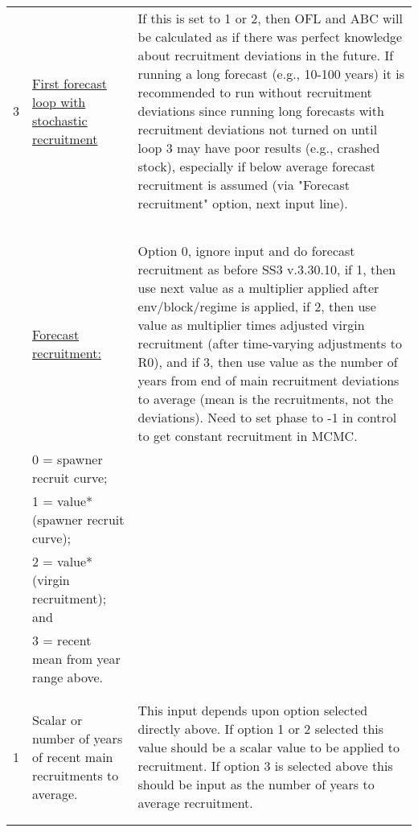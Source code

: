\begin{landscape}
{\begin{longtable}{p{3.2cm} p{7cm} p{10.8cm}}
 \hline  
 3 \Tstrut & \hyperlink{appendB}{First forecast loop with stochastic recruitment} & \multirow{1}{1cm}[-0.25cm]{\parbox{11cm}{If this is set to 1 or 2, then OFL and ABC will be calculated as if there was perfect knowledge about recruitment deviations in the future. If running a long forecast (e.g., 10-100 years) it is recommended to run without recruitment deviations since running long forecasts with recruitment deviations not turned on until loop 3 may have poor results (e.g., crashed stock), especially if below average forecast recruitment is assumed (via "Forecast recruitment" option, next input line). }} \Bstrut\\
  & & \\
  & & \\
  & & \\
  & & \\
  & & \\
 
 \pagebreak
 0 \Tstrut & \hyperlink{ForeSpawn}{Forecast recruitment:} & \multirow{1}{1cm}[-0.25cm]{\parbox{11cm}{Option 0, ignore input and do forecast recruitment as before SS3 v.3.30.10, if 1, then use next value as a multiplier applied after env/block/regime is applied, if 2, then use value as multiplier times adjusted virgin recruitment (after time-varying adjustments to R0), and if 3, then use value as the number of years from end of main recruitment deviations to average (mean is the recruitments, not the deviations). Need to set phase to -1 in control to get constant recruitment in MCMC.}} \\
    & 0 = spawner recruit curve; & \\
    & 1 = value*(spawner recruit curve); & \\
    & 2 = value*(virgin recruitment); and & \\
    & 3 = recent mean from year range above. & \\
    & & \\
    & & \\
     
 \hline
 1 \Tstrut & Scalar or number of years of recent main recruitments to average. & \multirow{1}{1cm}[-0.25cm]{\parbox{11cm}{This input depends upon option selected directly above.  If option 1 or 2 selected this value should be a scalar value to be applied to recruitment. If option 3 is selected above this should be input as the number of years to average recruitment.}} \\
 & & \\
 & & \\
 

\end{longtable}}
\end{landscape}
